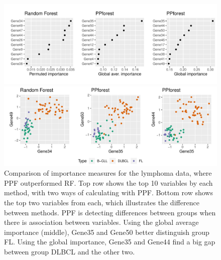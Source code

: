 \documentclass[12pt]{article}\usepackage[]{graphicx}\usepackage[]{color}
\makeatletter
\def\maxwidth{ %
  \ifdim\Gin@nat@width>\linewidth
    \linewidth
  \else
    \Gin@nat@width
  \fi
}
\newenvironment{knitrout}{}{} %
\makeatother
\begin{document}
\begin{figure}[!ht]
\begin{center}
\begin{knitrout}
\color{fgcolor}
\includegraphics[width=\maxwidth]{figure/globalimpoe-1} 

\end{knitrout}
\begin{knitrout}
\color{fgcolor}
\includegraphics[width=\maxwidth]{figure/globalimpoevars-1} 

\end{knitrout}
\caption{Comparison of importance measures for the lymphoma data, where PPF outperformed RF. Top row shows the top 10 variables by each method, with two ways of calculating with PPF. Bottom row shows the top two variables from each, which illustrates the difference between methods. PPF is detecting differences between groups when there is association between variables. Using the global average importance (middle), Gene35 and Gene50 better distinguish group FL. Using the global importance, Gene35 and Gene44 find a big gap between group DLBCL and the other two. \label{globalimp}}
\end{center}
\end{figure}
\end{document}

